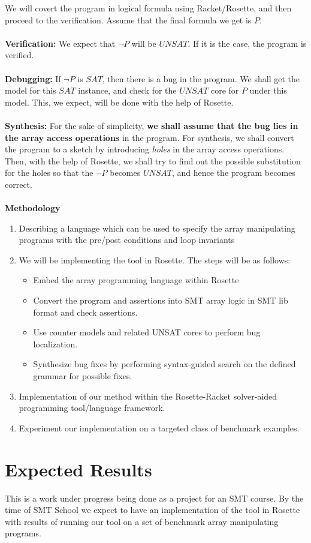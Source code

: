 \documentclass[letterpaper]{article} %
\begin{document}
We will covert the program in logical formula using Racket/Rosette, and then proceed to the verification. Assume that the final formula we get is $P$.\\\\
{\bf Verification:} We expect that $\neg P$ will be $UNSAT$. If it is the case, the program is verified.
\\\\
{\bf Debugging:} If $\neg P$ is $SAT$, then there is a bug in the program. We shall get the model for this $SAT$ instance, and check for the $UNSAT$ core for $P$ under this model. This, we expect, will be done with the help of Rosette. \\
\\
{\bf Synthesis:} For the sake of simplicity, {\bf we shall assume that the bug lies in the array access operations} in the program. For synthesis, we shall convert the program to a sketch by introducing \emph{holes} in the array access operations. Then, with the help of Rosette, we shall try to find out the possible substitution for the holes so that the $\neg P$ becomes $UNSAT$, and hence the program becomes correct. \\
\\
{\bf Methodology}
\begin{enumerate}
	\item  Describing a language which can be used to specify the array manipulating programs with the pre/post conditions and loop invariants
	\item We will be implementing the tool in Rosette. The steps will be as follows:
	\begin{itemize}
		\item Embed the array programming language within Rosette
		\item Convert the program and assertions into SMT array logic in SMT lib format and check assertions.
		\item Use counter models and related UNSAT cores to perform bug localization.
		\item Synthesize bug fixes by performing syntax-guided search on the defined grammar for possible fixes.
	\end{itemize}
	\item Implementation of our method within the Rosette-Racket solver-aided programming tool/language framework.
	\item Experiment our implementation on a targeted class of benchmark examples.
\end{enumerate}


\section{Expected Results}
This is a work under progress being done as a project for an SMT course.
By the time of SMT School we expect to have an implementation of the tool in Rosette with results of running our tool on a set of benchmark array manipulating programs.



\end{document}
